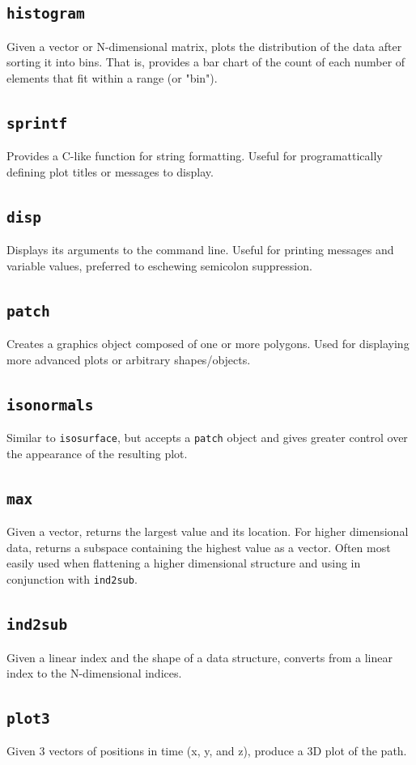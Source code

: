 \documentclass[journal]{IEEEtran}
\def\code#1{\texttt{#1}}
\begin{document}
\subsection{\code{histogram}}
Given a vector or N-dimensional matrix, plots the distribution of the data after sorting it into bins. That is, provides a bar chart of the count of each number of elements that fit within a range (or "bin").
\subsection{\code{sprintf}}
Provides a C-like function for string formatting. Useful for programattically defining plot titles or messages to display.
\subsection{\code{disp}}
Displays its arguments to the command line. Useful for printing messages and variable values, preferred to eschewing semicolon suppression.
\subsection{\code{patch}}
Creates a graphics object composed of one or more polygons. Used for displaying more advanced plots or arbitrary shapes/objects.
\subsection{\code{isonormals}}
Similar to \code{isosurface}, but accepts a \code{patch} object and gives greater control over the appearance of the resulting plot.
\subsection{\code{max}}
Given a vector, returns the largest value and its location. For higher dimensional data, returns a subspace containing the highest value as a vector. Often most easily used when flattening a higher dimensional structure and using in conjunction with \code{ind2sub}.
\subsection{\code{ind2sub}}
Given a linear index and the shape of a data structure, converts from a linear index to the N-dimensional indices.
\subsection{\code{plot3}}
Given 3 vectors of positions in time (x, y, and z), produce a 3D plot of the path.
\end{document}
